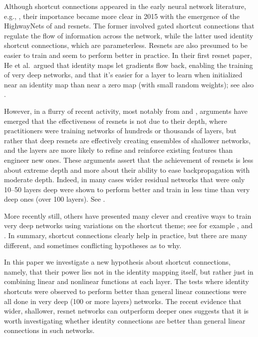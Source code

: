 \documentclass{article} %
\begin{document}
Although shortcut connections appeared in the early neural network literature, e.g., \cite{Bishop,Ripley,Centering}, their importance became more clear in 2015 with the emergence of the HighwayNets of \cite{HighwayNets} and resnets.  The former involved gated shortcut connections that regulate the flow of information across the network, while the latter used identity shortcut connections, which are parameterless.  Resnets are also presumed to be easier to train and seem to perform better in practice. 
In their first resnet paper, He et al.~argued that identity maps let gradients flow back, enabling the training of very deep networks, and that it's easier for a layer to learn when initialized near an identity map than near a zero map (with small random weights); see also \cite{IdentityMappings}. %

However, in a flurry of recent activity, most notably from \cite{Wideresnets, UnrolledIterativeEstimation, EnsemblesofRelativelyShallow, Demystifying} and \cite {WiderOrDeeper}, arguments have emerged that the effectiveness of resnets is not due to their depth, where practitioners were training networks of hundreds or thousands of layers, but rather that deep resnets are effectively creating ensembles of shallower networks, and the layers are more likely to refine and reinforce existing features than engineer new ones.  These arguments assert that the achievement of resnets is less about extreme depth and more about their ability to ease backpropagation with moderate depth.  Indeed, in many cases wider residual networks that were only 10--50 layers deep were shown to perform better and train in less time than very deep ones (over 100 layers). See \cite{Wideresnets}.

More recently still, others have presented many clever and creative ways to train very deep networks using variations on the shortcut theme; see for example \cite{DenselyConnected, FractalNet, Multilevel, Pyramidal, Multiresidual, DualPath, Polynet, ResNets, WideResidualInception, Aggregated, ResidualGates, Inception,RethinkingInception}, and \cite{InceptionResNet}.   
In summary, shortcut connections clearly help in practice, but there are many different, and sometimes conflicting hypotheses as to why.

In this paper we investigate a new hypothesis about shortcut connections, namely, that their power lies not in the identity mapping itself, but rather just in combining linear and nonlinear functions at each layer.   The tests where identity shortcuts were observed to perform better than general linear connections were all done in very deep (100 or more layers) networks. The recent evidence that wider, shallower, resnet networks can outperform deeper ones suggests that it is worth investigating whether identity connections are better than general linear connections in such networks. 
\end{document}
